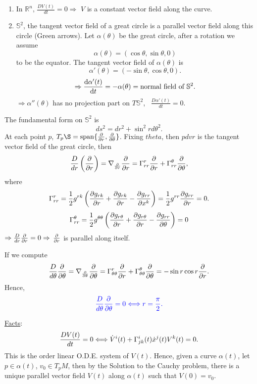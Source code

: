 \begin{example}
    \begin{enumerate}[(1)]
        \item In \(\mathbb{R}^n\), \(\frac{DV(t)}{dt}=0\Rightarrow\) \(V\)
        is a constant vector field along the curve.
        \item \(\mathbb{S}^2\), the tangent vector field of a 
        great circle is a parallel vector field along this circle
        (Green arrows). Let \(\alpha(\theta)\) be the great circle, after a
        rotation we assume
        \[
            \alpha(\theta)=\left(\cos\theta,\sin\theta,0\right)
        \]
        to be the equator. The tangent vector field of \(\alpha(\theta)\)
        is 
        \[
            \alpha'(\theta)=\left(-\sin\theta,\cos\theta,0\right)    .
        \]
        \[
            \Rightarrow \dv{\alpha'(t)}{t}=-\alpha(\theta)=\text{normal
            field of }\mathbb{S}^2.    
        \]
        \(\Rightarrow \alpha''(\theta)\) has no projection part
        on \(T\mathbb{S}^2\), \ie\ \(\frac{D\alpha'(t)}{dt}=0\).
    \end{enumerate}
\end{example}
\begin{remark}
    The  fundamental form on \(\mathbb{S}^2\) is
    \[
        ds^2=dr^2+\sin^2r d \theta^2    .
    \]
    At each point \(p\), \(T_p\S=\Span\{\pdv{r},\pdv{\theta}\}\).
    Fixing \(theta\), then \(pdv{r}\) is the tangent vector field
    of the great circle, then 
    \[
        \frac{D}{dr}\left(\pdv{r}\right)=\nabla_{\pdv{r}}\pdv{r}
        =\Gamma\indices*{_{rr}^r}\pdv{r}+\Gamma\indices*{_{rr}^\theta}
        \pdv{\theta},
    \]
    where
    \[
        \Gamma\indices*{_{rr}^r}=\frac{1}{2}g^{rk}\left(
            \pdv{g_{rk}}{r}+\pdv{g_{rk}}{r}-\pdv{g_{rr}}{x^k}
        \right)
        =\frac{1}{2}g^{rr}\pdv{g_{rr}}{r}=0.
    \]
    \[
        \Gamma\indices*{_{rr}^\theta}=\frac{1}{2}
        g^{\theta\theta}\left(
            \pdv{g_{r\theta}}{r}
            +\pdv{g_{r\theta}}{r}
            -\pdv{g_{rr}}{\theta}
        \right)
        =0    
    \]
    \(\Rightarrow\frac{D}{dr}\pdv{r}=0\Rightarrow\) \(\pdv{r}\)
    is parallel along itself.

    If we compute 
    \[
        \frac{D}{d\theta}\pdv{\theta}=\nabla_{\pdv{\theta}}\pdv{\theta}
        =\Gamma\indices*{_{\theta\theta}^r}\pdv{r}+\Gamma
        \indices*{_{\theta\theta}^\theta}\pdv{\theta}
        =-\sin r\cos r \pdv{r}.    
    \]
    Hence, 
    \[
        \textcolor{blue}{
            \frac{D}{d\theta}\pdv{\theta}=0
            \Longleftrightarrow r=\frac{\pi}{2}.}
    \]
\end{remark}
\underline{Facts}:
\[
    \frac{DV(t)}{dt}=0\Longleftrightarrow 
    \dot{V}^i(t)+\Gamma\indices*{_{jk}^i}(t)\dot{x}^j(t)V^k(t)=0.    
\]
This is the  order linear O.D.E. system of
\(V(t)\). Hence, given a curve \(\alpha(t)\), let \(p\in\alpha(t)\),
\(v_0\in T_p M\), then by the Solution to the Cauchy problem, there is 
a unique parallel vector field \(V(t)\) along \(\alpha(t)\) such that 
\(V(0)=v_0\). 

